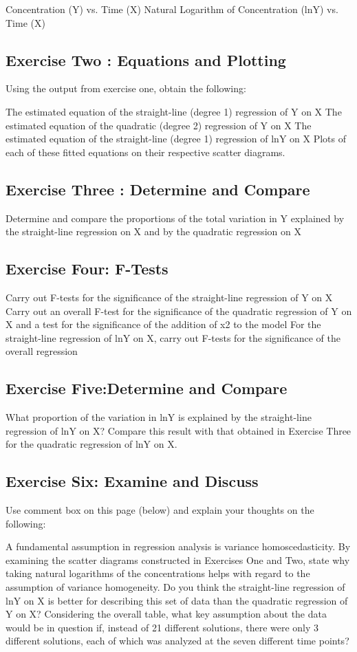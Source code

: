 \documentclass[a4paper,12pt]{article}
\begin{document}
Concentration (Y) vs. Time (X)
Natural Logarithm of Concentration (lnY) vs. Time (X)
 

\subsection*{Exercise Two : Equations and Plotting}

Using the output from exercise one, obtain the following:

The estimated equation of the straight-line (degree 1) regression of Y on X
The estimated equation of the quadratic (degree 2) regression of Y on X
The estimated equation of the straight-line (degree 1) regression of lnY on X
Plots of each of these fitted equations on their respective scatter diagrams.
 

\subsection*{Exercise Three : Determine and Compare}

Determine and compare the proportions of the total variation in Y explained by the straight-line regression on X and by the quadratic regression on X
 

\subsection*{Exercise Four: F-Tests}

Carry out F-tests for the significance of the straight-line regression of Y on X
Carry out an overall F-test for the significance of the quadratic regression of Y on X and a test for the significance of the addition of x2 to the model
For the straight-line regression of lnY on X, carry out F-tests for the significance of the overall regression
 

\subsection*{Exercise Five:Determine and Compare}

What proportion of the variation in lnY is explained by the straight-line regression of lnY on X?
Compare this result with that obtained in Exercise Three for the quadratic regression of lnY on X.
 

\subsection*{Exercise Six: Examine and Discuss}

Use comment box on this page (below) and explain your thoughts on the following:

A fundamental assumption in regression analysis is variance homoscedasticity. By examining the scatter diagrams constructed in Exercises One and Two, state why taking natural logarithms of the concentrations helps with regard to the assumption of variance homogeneity.
Do you think the straight-line regression of lnY on X is better for describing this set of data than the quadratic regression of Y on X?
Considering the overall table, what key assumption about the data would be in question if, instead of 21 different solutions, there were only 3 different solutions, each of which was analyzed at the seven different time points?
\end{document}
